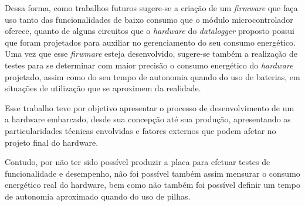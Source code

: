 Dessa forma, como trabalhos futuros sugere-se a criação de um \textit{firmware} que faça uso tanto das funcionalidades de baixo consumo que o módulo microcontrolador oferece, quanto de alguns circuitos que o \textit{hardware} do \textit{datalogger} proposto possui que foram projetados para auxiliar no gerenciamento do seu consumo energético. Uma vez que esse \textit{firwmare} esteja desenvolvido, sugere-se também a realização de testes para se determinar com maior precisão o consumo energético do \textit{hardware} projetado, assim como do seu tempo de autonomia quando do uso de baterias, em situações de utilização que se aproximem da realidade.

































Esse trabalho teve por objetivo apresentar o processo de desenvolvimento de um a hardware embarcado, desde sua concepção até sua produção, apresentando as particularidades técnicas envolvidas e fatores externos que podem afetar no projeto final do hardware. 

Contudo, por não ter sido possível produzir a placa para efetuar testes de funcionalidade e desempenho, não foi possível também assim mensurar o consumo energético real do hardware, bem como não também foi possível definir um tempo de autonomia aproximado quando do uso de pilhas.

